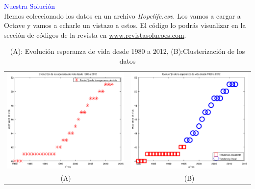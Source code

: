 \vspace{1cm} 
\textcolor{blue}{\Large Nuestra Solución}\\ 
Hemos coleccionado los datos
en un archivo \emph{Hopelife.csv}. Los vamos a cargar a Octave y vamos
a echarle un vistazo a estos. El código lo podrás visualizar en la
sección de códigos de la revista en \url{www.revistasolucoes.com}.
\begin{table}
\begin{center}
\begin{tabular}{cc}
\includegraphics[scale=.45]{DatosPuros.eps} & \includegraphics[scale=.45]{DatosTendencia.eps}\\
(A) & (B) \\
\end{tabular}\caption{(A): Evolución esperanza de vida desde 1980 a 2012, (B):Clusterización de los datos }
\end{center}
\end{table}\label{datos}




